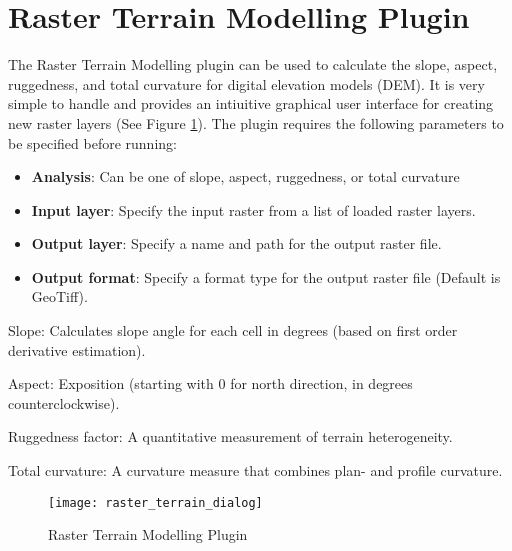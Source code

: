 
\section{Raster Terrain Modelling Plugin}


The Raster Terrain Modelling plugin can be used to calculate the slope, aspect, ruggedness, and
total curvature for digital elevation models (DEM). It is very simple to handle and provides an
intiuitive graphical user interface for creating new raster layers (See Figure
\ref{fig:raster_terrain_dialog}).
The plugin requires the following parameters to be specified before running:

\begin{itemize}
\item \textbf{Analysis}: Can be one of slope, aspect, ruggedness, or total curvature
\item \textbf{Input layer}: Specify the input raster from a list of loaded
raster layers.
\item \textbf{Output layer}: Specify a name and path for the output raster file.
\item \textbf{Output format}: Specify a format type for the output raster file (Default is GeoTiff).
\end{itemize}

Slope: Calculates slope angle for each cell in degrees (based on first order derivative estimation).

Aspect: Exposition (starting with 0 for north direction, in degrees counterclockwise).

Ruggedness factor: A quantitative measurement of terrain heterogeneity.

Total curvature: A curvature measure that combines plan- and profile curvature.

\begin{figure}[ht]
   \begin{center}
   \caption{Raster Terrain Modelling Plugin \nixcaption}\label{fig:raster_terrain_dialog}\smallskip
   \texttt{[image: raster\_terrain\_dialog]}
\end{center}  
\end{figure}

\label{raster_terrain_usage}

